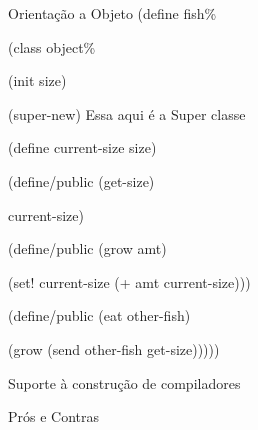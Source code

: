 \documentclass{beamer}
\begin{document}
\begin{frame}{Orientação a Objeto}
(define fish\%

  (class object\%
  
    (init size) 
    
    (super-new) Essa aqui é a Super classe
    
    (define current-size size)
    
    (define/public (get-size)
    
      current-size)
      
    (define/public (grow amt)
    
      (set! current-size (+ amt current-size)))
      
    (define/public (eat other-fish)
    
      (grow (send other-fish get-size)))))


\end{frame}
\begin{frame}{Suporte à construção de compiladores}

\end{frame}


\begin{frame}{Prós e Contras}

\end{frame}
\end{document}
